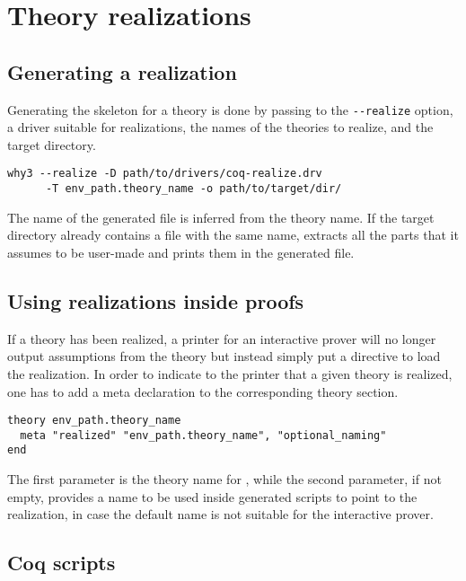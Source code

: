 \chapter{Theory realizations}
\label{chap:realizations}

\section{Generating a realization}

Generating the skeleton for a theory is done by passing to \why the
\verb+--realize+ option, a driver suitable for realizations, the names of
the theories to realize, and the target directory.

\begin{verbatim}
why3 --realize -D path/to/drivers/coq-realize.drv
      -T env_path.theory_name -o path/to/target/dir/
\end{verbatim}

The name of the generated file is inferred from the theory name. If the
target directory already contains a file with the same name, \why
extracts all the parts that it assumes to be user-made and prints them in
the generated file.

\section{Using realizations inside proofs}

If a theory has been realized, a \why printer for an interactive prover
will no longer output assumptions from the theory but instead simply put
a directive to load the realization. In order to indicate to the printer
that a given theory is realized, one has to add a meta declaration to the
corresponding theory section.

\begin{verbatim}
theory env_path.theory_name
  meta "realized" "env_path.theory_name", "optional_naming"
end
\end{verbatim}

The first parameter is the theory name for \why, while the second
parameter, if not empty, provides a name to be used inside generated
scripts to point to the realization, in case the default name is not
suitable for the interactive prover.

\section{Coq scripts}

